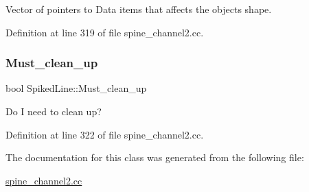 Vector of pointers to Data items that affects the object\textquotesingle{}s shape. 



Definition at line 319 of file spine\+\_\+channel2.\+cc.

\mbox{\label{classSpikedLine_a4ac7004ff4f8417640ad07ad32b9c9e0}} 
\subsubsection{\texorpdfstring{Must\+\_\+clean\+\_\+up}{Must\_clean\_up}}
{\footnotesize\ttfamily bool Spiked\+Line\+::\+Must\+\_\+clean\+\_\+up\hspace{0.3cm}{\ttfamily [private]}}



Do I need to clean up? 



Definition at line 322 of file spine\+\_\+channel2.\+cc.



The documentation for this class was generated from the following file\+:\begin{DoxyCompactItemize}
\item 
\hyperlink{spine__channel2_8cc}{spine\+\_\+channel2.\+cc}\end{DoxyCompactItemize}
